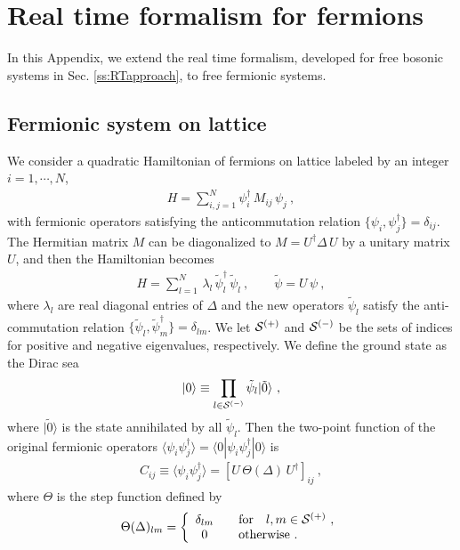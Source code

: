 \section{Real time formalism for fermions}\label{ss:RTFermion}
In this Appendix, we extend the real time formalism, developed for free bosonic systems in Sec. \ref{ss:RTapproach}, to free fermionic systems.


\subsection{Fermionic system on lattice}
We consider a quadratic Hamiltonian of fermions on lattice labeled by an integer $i=1,\cdots, N$,
\begin{align}
	H = \sum_{i,j = 1}^N \psi^\dagger_i\, M_{ij}\, \psi_j \ ,
\end{align}
with fermionic operators satisfying the anticommutation relation $\{\psi_i, \psi_j^\dagger \} = \delta_{ij}$.
The Hermitian matrix $M$ can be diagonalized to $M=U^\dagger \Delta \,U$ by a unitary matrix $U$, and then the Hamiltonian becomes
\begin{align}
	H = \sum_{l=1}^N\, \lambda_l \,\tilde\psi_l^\dagger\, \tilde\psi_l \ , \qquad \tilde\psi = U\, \psi \ ,
\end{align}
where $\lambda_l$ are real diagonal entries of $\Delta$ and the new operators $\tilde\psi_l$ satisfy the anti-commutation relation $\{\tilde\psi_l, \tilde\psi_m^\dagger \} = \delta_{lm}$.
We let ${\cal S}^{(+)}$ and ${\cal S}^{(-)}$ be the sets of indices for positive and negative eigenvalues, respectively.
We define the ground state as the Dirac sea 
\begin{align}
	|0\rangle \equiv \prod_{l\in {\cal S}^{(-)}} \tilde\psi_l |\tilde 0 \rangle \ ,
\end{align}
where $|\tilde 0 \rangle$ is the state annihilated by all $\tilde\psi_l$.
Then the two-point function of the original fermionic operators $\langle \psi_i \psi_j^\dagger \rangle = \langle 0 | \psi_i \psi_j^\dagger |0 \rangle$ is
\begin{align}\label{FermC}
	C_{ij} \equiv \langle \psi_i \psi_j^\dagger \rangle = \left[ U\, \Theta (\Delta)\, U^\dagger\right]_{ij} \ ,
\end{align}
where $\Theta$ is the step function defined by
\begin{align}
	\Theta (\Delta)_{lm} = \left\{\begin{array}{cl}
						\delta_{lm} & \quad \text{for}\quad l, m \in {\cal S}^{(+)} \ , \\
						0 & \quad \text{otherwise} \ .
					\end{array}\right.
\end{align}

